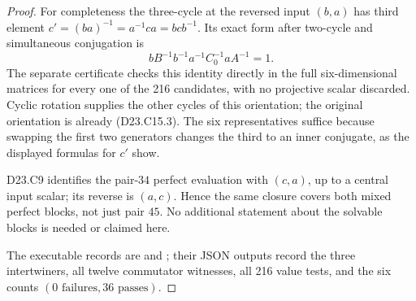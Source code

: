 \begin{proof}
For completeness the three-cycle at the reversed input $(b,a)$
has third element $c'=(ba)^{-1}=a^{-1}ca=bcb^{-1}$. Its exact
form after two-cycle and simultaneous conjugation is
\[
              bB^{-1}b^{-1}a^{-1}C_0^{-1}aA^{-1}=1.
\tag{D23.C15.4}
\]
The separate certificate checks this identity directly in the full
six-dimensional matrices for every one of the 216 candidates,
with no projective scalar discarded. Cyclic rotation supplies the
other cycles of this orientation; the original orientation is
already (D23.C15.3). The six representatives suffice because
swapping the first two generators changes the third to an inner
conjugate, as the displayed formulas for $c'$ show.

D23.C9 identifies the pair-$34$ perfect evaluation with $(c,a)$,
up to a central input scalar; its reverse is $(a,c)$. Hence the
same closure covers both mixed perfect blocks, not just pair $45$.
No additional statement about the solvable blocks is needed or
claimed here.

The executable records are
 and
;
their JSON outputs record the three intertwiners, all twelve
commutator witnesses, all 216 value tests, and the six counts
$(0\text{ failures},36\text{ passes})$.
\end{proof}
